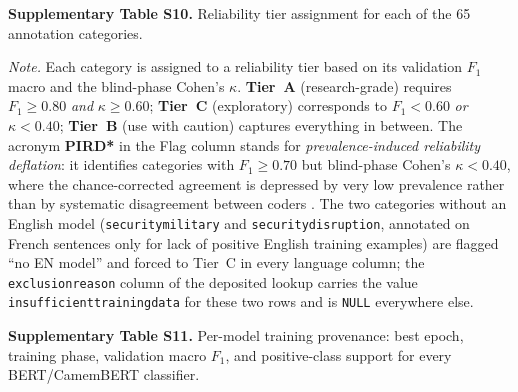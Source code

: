 \documentclass[12pt]{article}
\makeatletter
\let\CCFlandscape@orig\landscape
\renewcommand{\landscape}{%
  \CCFlandscape@orig
  \setlength{\textwidth}{\dimexpr\paperheight-5cm\relax}%
  \setlength{\linewidth}{\textwidth}%
  \setlength{\hsize}{\textwidth}%
  \setlength{\columnwidth}{\textwidth}%
}
\renewcommand\_{\texttt{\detokenize{_}\allowbreak}}
\makeatother
\begin{document}
\endlandscape

\landscape
\noindent\textbf{Supplementary Table S10.} Reliability tier assignment for each of the 65 annotation categories.
\vspace{0.5em}

{\footnotesize

}

\vspace{0.5em}
\noindent\footnotesize
\textit{Note.} Each category is assigned to a reliability tier based on its validation $F_1$ macro and the blind-phase Cohen's $\kappa$. \textbf{Tier~A} (research-grade) requires $F_1 \geq 0.80$ \emph{and} $\kappa \geq 0.60$; \textbf{Tier~C} (exploratory) corresponds to $F_1 < 0.60$ \emph{or} $\kappa < 0.40$; \textbf{Tier~B} (use with caution) captures everything in between. The acronym \textbf{PIRD*} in the Flag column stands for \emph{prevalence-induced reliability deflation}: it identifies categories with $F_1 \geq 0.70$ but blind-phase Cohen's $\kappa < 0.40$, where the chance-corrected agreement is depressed by very low prevalence rather than by systematic disagreement between coders \autocite{feinstein_high_1990, byrt_bias_1993}. The two categories without an English model (\texttt{security\_military} and \texttt{security\_disruption}, annotated on French sentences only for lack of positive English training examples) are flagged ``no EN model'' and forced to Tier~C in every language column; the \texttt{exclusion\_reason} column of the deposited lookup carries the value \texttt{insufficient\_training\_data} for these two rows and is \texttt{NULL} everywhere else.

\endlandscape

\landscape
\noindent\textbf{Supplementary Table S11.} Per-model training provenance: best epoch, training phase, validation macro $F_1$, and positive-class support for every BERT/CamemBERT classifier.
\vspace{0.5em}

{\scriptsize

}
\end{document}

